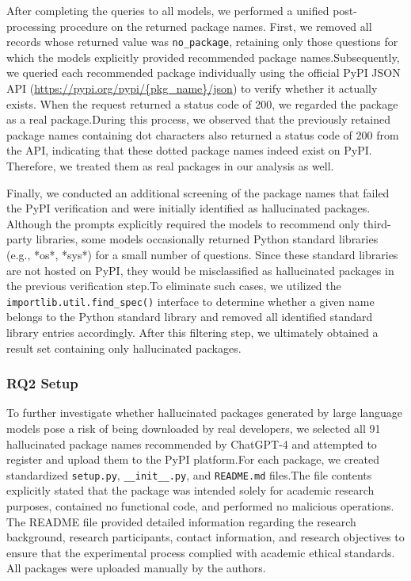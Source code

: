 After completing the queries to all models, we performed a unified post-processing procedure on the returned package names. First, we removed all records whose 
returned value was \texttt{no\_package}, retaining only those questions for which the models explicitly provided recommended package names.Subsequently, we queried each 
recommended package individually using the official PyPI JSON API (\url{https://pypi.org/pypi/\{pkg\_name\}/json}) to verify whether it actually exists. When the request 
returned a status code of 200, we regarded the package as a real package.During this process, we observed that the previously 
retained package names containing dot characters also returned a status code of 200 from the API, indicating that these dotted package names indeed exist on PyPI. 
Therefore, we treated them as real packages in our analysis as well.

Finally, we conducted an additional screening of the package names that failed the PyPI verification and were initially identified as hallucinated packages. Although 
the prompts explicitly required the models to recommend only third-party libraries, some models occasionally returned Python standard libraries (e.g., *os*, *sys*) 
for a small number of questions. Since these standard libraries are not hosted on PyPI, they would be misclassified as hallucinated packages in the previous 
verification step.To eliminate such cases, we utilized the \texttt{importlib.util.find\_spec()} interface to determine whether a given name belongs to the Python 
standard library and removed all identified standard library entries accordingly. After this filtering step, we ultimately obtained a result set containing only 
hallucinated packages.

\subsubsection{RQ2 Setup}
To further investigate whether hallucinated packages generated by large language models pose a risk of being downloaded by real developers, we selected all 91 
hallucinated package names recommended by ChatGPT-4 and attempted to register and upload them to the PyPI platform.For each package, we created standardized 
\texttt{setup.py}, \texttt{\_\_init\_\_.py}, and \texttt{README.md} files.The file contents explicitly stated that the package was intended solely for academic 
research purposes, contained no functional code, and performed no malicious operations. The README file provided detailed information regarding the research 
background, research participants, contact information, and research objectives to ensure that the experimental process complied with academic ethical standards. 
All packages were uploaded manually by the authors.

